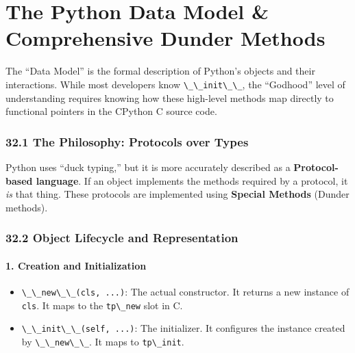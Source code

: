\hypertarget{the-python-data-model-comprehensive-dunder-methods}{%
\chapter{The Python Data Model \& Comprehensive Dunder
Methods}\label{the-python-data-model-comprehensive-dunder-methods}}

The ``Data Model'' is the formal description of Python's objects and
their interactions. While most developers know
\passthrough{\lstinline!\_\_init\_\_!}, the ``Godhood'' level of
understanding requires knowing how these high-level methods map directly
to functional pointers in the CPython C source code.

\hypertarget{the-philosophy-protocols-over-types}{%
\subsection{32.1 The Philosophy: Protocols over
Types}\label{the-philosophy-protocols-over-types}}

Python uses ``duck typing,'' but it is more accurately described as a
\textbf{Protocol-based language}. If an object implements the methods
required by a protocol, it \emph{is} that thing. These protocols are
implemented using \textbf{Special Methods} (Dunder methods).

\hypertarget{object-lifecycle-and-representation}{%
\subsection{32.2 Object Lifecycle and
Representation}\label{object-lifecycle-and-representation}}

\hypertarget{creation-and-initialization}{%
\subsubsection{1. Creation and
Initialization}\label{creation-and-initialization}}

\begin{itemize}
\tightlist
\item
  \passthrough{\lstinline!\_\_new\_\_(cls, ...)!}: The actual
  constructor. It returns a new instance of
  \passthrough{\lstinline!cls!}. It maps to the
  \passthrough{\lstinline!tp\_new!} slot in C.
\item
  \passthrough{\lstinline!\_\_init\_\_(self, ...)!}: The initializer. It
  configures the instance created by
  \passthrough{\lstinline!\_\_new\_\_!}. It maps to
  \passthrough{\lstinline!tp\_init!}.
\end{itemize}

